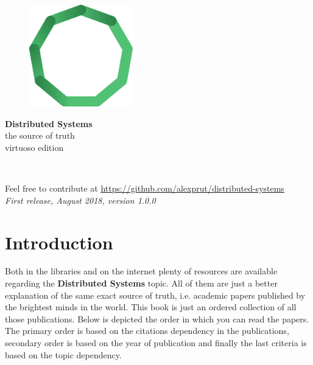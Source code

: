 \documentclass[11pt,fleqn]{book} %
\begin{document}

\begingroup
\thispagestyle{empty}
\pagecolor{cloud}\afterpage{\nopagecolor}
\centering
\vspace*{3cm}
\par\normalfont\fontsize{35}{35}\sffamily\selectfont
\begin{figure}[h]
    \centering
    \includegraphics[width=0.4\textwidth]{distributed-systems.pdf}
\end{figure}
\vspace*{1cm}
\textbf{Distributed Systems}\\
{\LARGE the source of truth} \\ {\small virtuoso edition}\par
\vspace*{1cm}
\endgroup


\newpage
~\vfill
\thispagestyle{empty}

\noindent Feel free to contribute at \url{https://github.com/alexprut/distributed-systems}\\ %

\noindent \textit{First release, August 2018, version 1.0.0} %

 
\tableofcontents %


\chapter*{Introduction}
Both in the libraries and on the internet plenty of resources are available regarding the \textbf{Distributed Systems} topic. All of them are just a better explanation of the same exact source of truth, i.e. academic papers published by the brightest minds in the world. This book is just an ordered collection of all those publications. Below is depicted the order in which you can read the papers. The primary order is based on the citations dependency in the publications, secondary order is based on the year of publication and finally the last criteria is based on the topic dependency.
\end{document}
